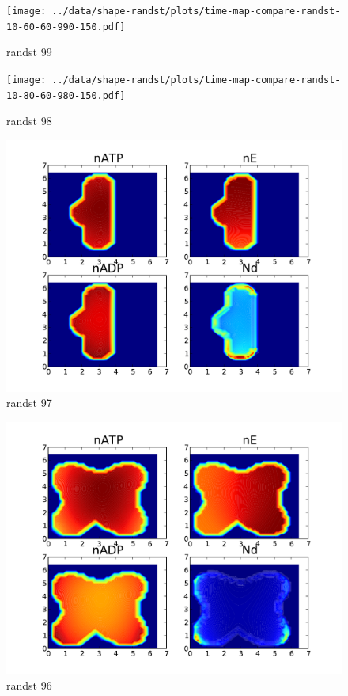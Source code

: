\documentclass[letterpaper,twocolumn,amsmath,amssymb,pre]{revtex4-1}
\begin{document}
\begin{figure}
  \texttt{[image: ../data/shape-randst/plots/time-map-compare-randst-10-60-60-990-150.pdf]}
  \caption{randst 99}
\end{figure}
\begin{figure}
  \texttt{[image: ../data/shape-randst/plots/time-map-compare-randst-10-80-60-980-150.pdf]}
  \caption{randst 98}
\end{figure}
\begin{figure}
  \includegraphics[width=\columnwidth]{../data/shape-randst/plots/time-map-compare-randst-10-60-60-970-150.pdf}
  \caption{randst 97}
\end{figure}
\begin{figure}
  \includegraphics[width=\columnwidth]{../data/shape-randst/plots/time-map-compare-randst-10-60-60-960-150.pdf}
  \caption{randst 96}
\end{figure}
\end{document}
